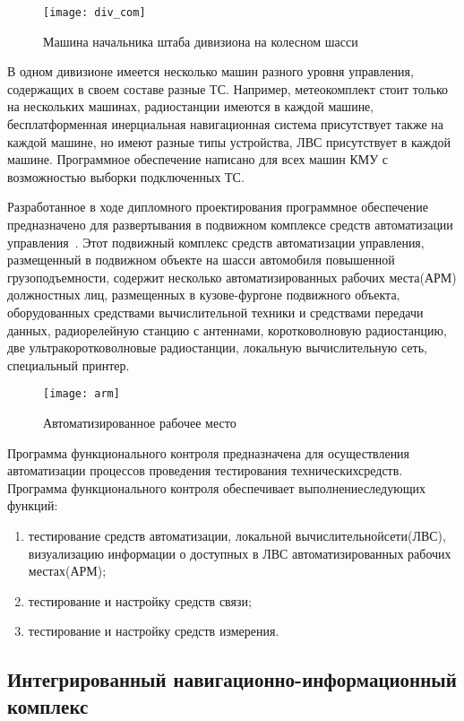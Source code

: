 \begin{figure}[ht]
	\centering
	\texttt{[image: div\_com]}
	\caption{Машина начальника штаба дивизиона на колесном шасси~\cite{div_car}}
	\label{fig:lit_reiview:analytics:div_com}
\end{figure}
В одном дивизионе имеется несколько машин разного уровня управления, содержащих в своем составе разные ТС.
Например, метеокомплект стоит только на нескольких машинах, радиостанции имеются в каждой машине, бесплатформенная
инерциальная навигационная система присутствует также на каждой машине, но имеют разные типы устройства,
ЛВС присутствует в каждой машине.
Программное обеспечение написано для всех машин КМУ с возможностью выборки подключенных ТС.

Разработанное в ходе дипломного проектирования программное обеспечение предназначено для развертывания в подвижном
комплексе средств автоматизации управления~\cite{patent_2263960}.
Этот подвижный комплекс средств автоматизации управления, размещенный в подвижном объекте на шасси автомобиля повышенной
грузоподъемности, содержит несколько автоматизированных рабочих места(АРМ) должностных лиц, размещенных в кузове-фургоне
подвижного объекта, оборудованных средствами вычислительной техники и средствами передачи данных, радиорелейную станцию
с антеннами, коротковолновую радиостанцию, две ультракоротковолновые радиостанции, локальную вычислительную
сеть, специальный принтер.

\begin{figure}[ht]
	\centering
	\texttt{[image: arm]}
	\caption{Автоматизированное рабочее место~\cite{patent_2263960}}
	\label{fig:lit_reiview:analytics:arm}
\end{figure}

Программа функционального контроля предназначена для осуществления автоматизации процессов проведения тестирования
технических\break средств.
Программа функционального контроля обеспечивает выполнение\break следующих функций:
\begin{enumerate}
\item тестирование средств автоматизации, локальной вычислительной\break сети(ЛВС), визуализацию информации о доступных в ЛВС автоматизированных рабочих местах(АРМ);
\item тестирование и настройку средств связи;
\item тестирование и настройку средств измерения.
\end{enumerate}

\subsection{Интегрированный навигационно-информационный комплекс}
\label{sub:lit_review:ins}

